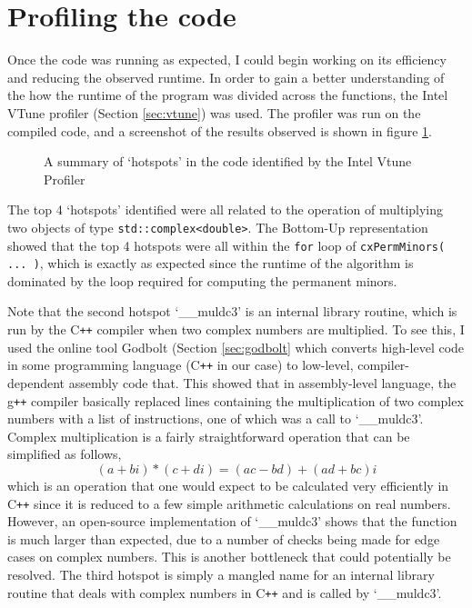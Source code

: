 \documentclass[ %
                    author={Manan Vaswani},
                supervisor={Dr. Raphael Clifford},
                    degree={MEng},
                     title={A multi-core CPU implementation of the classical Boson Sampling algorithm},
                  subtitle={},
                      type={},
                      year={2019} ]{dissertation}
\theoremstyle{plain}
\theoremstyle{definition}
\begin{document}
\section{Profiling the code}
Once the code was running as expected, I could begin working on its efficiency and reducing the observed runtime. In order to gain a better understanding of the how the runtime of the program was divided across the functions, the Intel VTune profiler \cite{vtune2018} (Section \ref{sec:vtune}) was used. The profiler was run on the compiled code, and a screenshot of the results observed is shown in figure \ref{fig:vtune_hotspots_initial}.
\begin{figure}
  \caption{A summary of `hotspots' in the code identified by the Intel Vtune Profiler}
  \label{fig:vtune_hotspots_initial}
\end{figure}
The top 4 `hotspots' identified were all related to the operation of multiplying two objects of type \texttt{std::complex<double>}. The Bottom-Up representation showed that the top 4 hotspots were all within the \texttt{for} loop of \texttt{cxPermMinors( ... )}, which is exactly as expected since the runtime of the algorithm is dominated by the loop required for computing the permanent minors.

Note that the second hotspot `\_\_muldc3' is an internal library routine, which is run by the C\texttt{++} compiler when two complex numbers are multiplied. To see this, I used the online tool Godbolt \cite{god-bolt} (Section \ref{sec:godbolt} which converts high-level code in some programming language (C\texttt{++} in our case) to low-level, compiler-dependent assembly code that. This showed that in assembly-level language, the g\texttt{++} compiler basically replaced lines containing the multiplication of two complex numbers with a list of instructions, one of which was a call to `\_\_muldc3'. Complex multiplication is a fairly straightforward operation that can be simplified as follows,
\begin{equation}
(a + bi) * (c+di) = (ac - bd) + (ad + bc)i
\end{equation}
which is an operation that one would expect to be calculated very efficiently in C\texttt{++} since it is reduced to a few simple arithmetic calculations on real numbers. However, an open-source implementation of `\_\_muldc3' \cite{muldc3} shows that the function is much larger than expected, due to a number of checks being made for edge cases on complex numbers. This is another bottleneck that could potentially be resolved. The third hotspot is simply a mangled name for an internal library routine that deals with complex numbers in C\texttt{++} and is called by `\_\_muldc3'.
\end{document}
